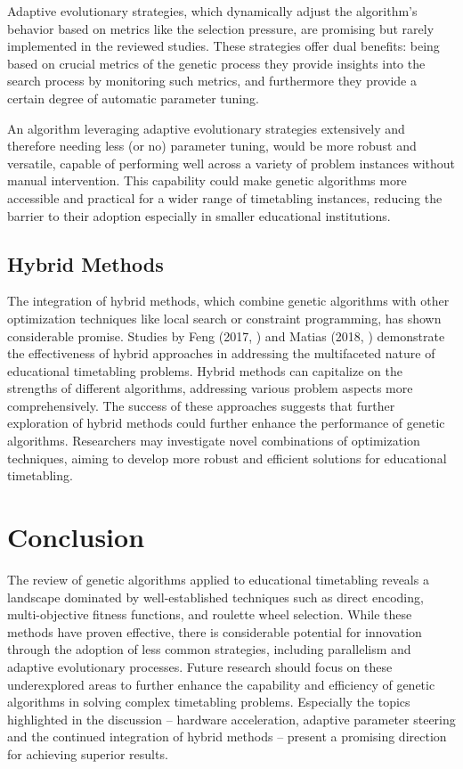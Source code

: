 \documentclass[sigconf]{acmart}
\begin{document}
Adaptive evolutionary strategies, which dynamically adjust the algorithm's
behavior based on metrics like the selection pressure, are promising but rarely
implemented in the reviewed studies.
These strategies offer dual benefits: being based on crucial metrics of the
genetic process they provide insights into the search process by monitoring
such metrics,
and furthermore they provide a certain degree of automatic parameter tuning.

An algorithm leveraging adaptive evolutionary strategies extensively and
therefore needing less (or no) parameter tuning, would be more robust and
versatile, capable of performing well across a variety of problem
instances without manual intervention. This capability could make genetic
algorithms more accessible and practical for a wider range of timetabling
instances, reducing the barrier to their adoption especially in smaller
educational institutions.

\subsection{Hybrid Methods}
The integration of hybrid methods, which combine genetic algorithms with other
optimization techniques like local search or constraint programming,
has shown considerable promise.
Studies by Feng (2017, \cite{Feng2017}) and Matias (2018, \cite{Matias2018fair})
demonstrate the effectiveness of hybrid approaches in addressing the
multifaceted nature of educational timetabling problems. Hybrid methods can
capitalize on the strengths of different algorithms, addressing various problem
aspects more comprehensively.
The success of these approaches suggests that further exploration of hybrid
methods could further enhance the performance of genetic algorithms.
Researchers may investigate novel combinations of optimization techniques,
aiming to develop more robust and efficient solutions for educational
timetabling.


\section{Conclusion}
The review of genetic algorithms applied to educational timetabling reveals a
landscape dominated by well-established techniques such as direct encoding,
multi-objective fitness functions, and roulette wheel selection. While these
methods have proven effective, there is considerable potential for innovation
through the adoption of less common strategies, including parallelism and 
adaptive evolutionary processes.
Future research should focus on these underexplored areas to further enhance
the capability and efficiency of genetic algorithms in solving complex
timetabling problems.
Especially the topics highlighted in the discussion -- hardware acceleration,
adaptive parameter steering and the continued integration of hybrid methods --
present a promising direction for achieving superior results.
\end{document}
